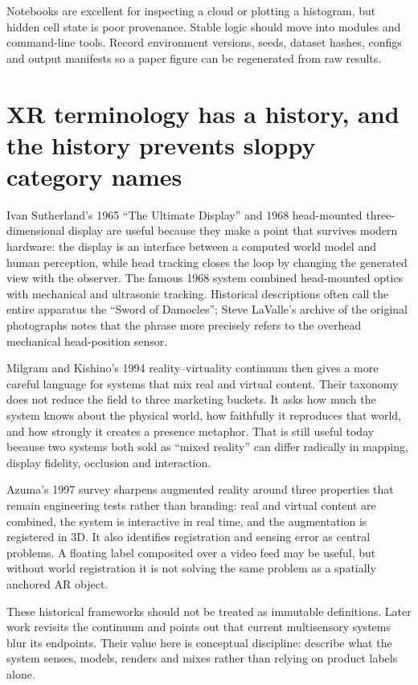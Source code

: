 Notebooks are excellent for inspecting a cloud or plotting a histogram, but hidden cell state is poor provenance. Stable logic should move into modules and command-line tools. Record environment versions, seeds, dataset hashes, configs and output manifests so a paper figure can be regenerated from raw results.

\section{XR terminology has a history, and the history prevents sloppy category names}\label{04-visual-computing-ii-ch035-xr-terminology-has-a-history-and-the-history-prevents-sloppy-category-names}

Ivan Sutherland's 1965 ``The Ultimate Display'' and 1968 head-mounted three-dimensional display are useful because they make a point that survives modern hardware: the display is an interface between a computed world model and human perception, while head tracking closes the loop by changing the generated view with the observer. The famous 1968 system combined head-mounted optics with mechanical and ultrasonic tracking. Historical descriptions often call the entire apparatus the ``Sword of Damocles''; Steve LaValle's archive of the original photographs notes that the phrase more precisely refers to the overhead mechanical head-position sensor.

Milgram and Kishino's 1994 reality--virtuality continuum then gives a more careful language for systems that mix real and virtual content. Their taxonomy does not reduce the field to three marketing buckets. It asks how much the system knows about the physical world, how faithfully it reproduces that world, and how strongly it creates a presence metaphor. That is still useful today because two systems both sold as ``mixed reality'' can differ radically in mapping, display fidelity, occlusion and interaction.

Azuma's 1997 survey sharpens augmented reality around three properties that remain engineering tests rather than branding: real and virtual content are combined, the system is interactive in real time, and the augmentation is registered in 3D. It also identifies registration and sensing error as central problems. A floating label composited over a video feed may be useful, but without world registration it is not solving the same problem as a spatially anchored AR object.

These historical frameworks should not be treated as immutable definitions. Later work revisits the continuum and points out that current multisensory systems blur its endpoints. Their value here is conceptual discipline: describe what the system senses, models, renders and mixes rather than relying on product labels alone.


